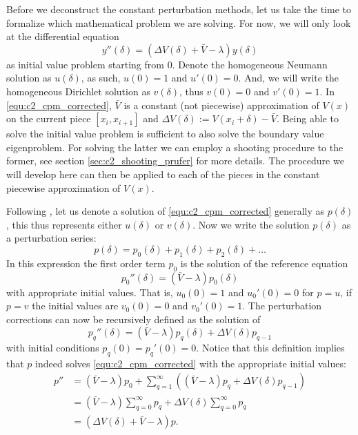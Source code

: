Before we deconstruct the constant perturbation methods, let us take the time to formalize which mathematical problem we are solving. For now, we will only look at the differential equation
\begin{equation}\label{equ:c2_cpm_corrected}
    y''(\delta) = (\Delta V(\delta) + \bar{V} - \lambda) y(\delta)
\end{equation}
as initial value problem starting from $0$. Denote the homogeneous Neumann solution as $u(\delta)$, as such, $u(0) = 1$ and $u'(0) = 0$. And, we will write the homogeneous Dirichlet solution as $v(\delta)$, thus $v(0) = 0$ and $v'(0)=1$. In \eqref{equ:c2_cpm_corrected}, $\bar{V}$ is a constant (not piecewise) approximation of $V(x)$ on the current piece $[x_i, x_{i+1}]$ and $\Delta V(\delta) := V(x_i + \delta) - \bar{V}$. Being able to solve the initial value problem is sufficient to also solve the boundary value eigenproblem. For solving the latter we can employ a shooting procedure to the former, see section \ref{sec:c2_shooting_prufer} for more details. The procedure we will develop here can then be applied to each of the pieces in the constant piecewise approximation of $V(x)$.

Following \cite{ixaru_numerical_1984,ixaru_cp_2000}, let us denote a solution of \eqref{equ:c2_cpm_corrected} generally as $p(\delta)$, this thus represents either $u(\delta)$ or $v(\delta)$. Now we write the solution $p(\delta)$ as a perturbation series:
$$
    p(\delta) = p_0(\delta) + p_1(\delta) + p_2(\delta) + \dots
$$
In this expression the first order term $p_0$ is the solution of the reference equation
\begin{equation}\label{equ:c2_p0_reference}
    p_0''(\delta) = (\bar{V} - \lambda) p_0(\delta)
\end{equation}
with appropriate initial values. That is, $u_0(0) = 1$ and $u_0'(0) = 0$ for $p = u$, if $p=v$ the initial values are $v_0(0)=0$ and $v_0'(0) = 1$. The perturbation corrections can now be recursively defined as the solution of
\begin{equation}\label{equ:c2_pq_definition}
    p_q''(\delta) = (\bar{V} - \lambda) p_q(\delta) + \Delta V(\delta) p_{q-1}
\end{equation}
with initial conditions $p_q(0) = p_q'(0) = 0$. Notice that this definition implies that $p$ indeed solves \eqref{equ:c2_cpm_corrected} with the appropriate initial values:
\begin{align*}
    p'' & = (\bar{V} - \lambda)p_0 + \sum_{q=1}^\infty\left((\bar{V} - \lambda)p_q + \Delta V(\delta) p_{q-1}\right) \\
        & = (\bar{V} - \lambda)\sum_{q=0}^\infty p_q + \Delta V(\delta) \sum_{q=0}^\infty p_q                        \\
        & = (\Delta V(\delta) + \bar{V} - \lambda)p\text{.}
\end{align*}

